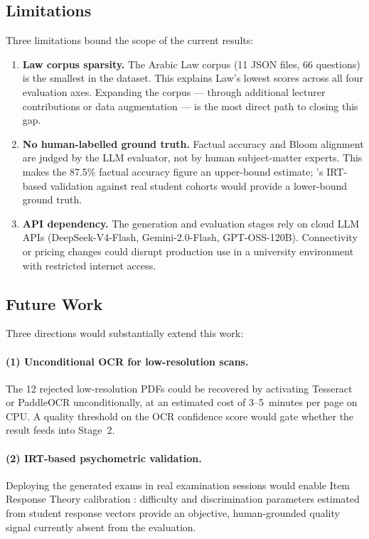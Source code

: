 \subsection*{Limitations}

Three limitations bound the scope of the current results:

\begin{enumerate}
  \item \textbf{Law corpus sparsity.}
  The Arabic Law corpus (11 JSON files, 66 questions) is the smallest in the dataset.
  This explains Law's lowest scores across all four evaluation axes.
  Expanding the corpus --- through additional lecturer contributions or data
  augmentation --- is the most direct path to closing this gap.

  \item \textbf{No human-labelled ground truth.}
  Factual accuracy and Bloom alignment are judged by the LLM evaluator, not by
  human subject-matter experts. This makes the 87.5\% factual accuracy figure an
  upper-bound estimate; \citet{isley2025quality}'s IRT-based validation against
  real student cohorts would provide a lower-bound ground truth.

  \item \textbf{API dependency.}
  The generation and evaluation stages rely on cloud LLM APIs
  (DeepSeek-V4-Flash, Gemini-2.0-Flash, GPT-OSS-120B).
  Connectivity or pricing changes could disrupt production use in a
  university environment with restricted internet access.
\end{enumerate}

\subsection*{Future Work}

Three directions would substantially extend this work:

\paragraph{(1) Unconditional OCR for low-resolution scans.}
The 12 rejected low-resolution PDFs could be recovered by activating Tesseract
or PaddleOCR unconditionally, at an estimated cost of 3--5~minutes per page on
CPU. A quality threshold on the OCR confidence score would gate whether the
result feeds into Stage~2.

\paragraph{(2) IRT-based psychometric validation.}
Deploying the generated exams in real examination sessions would enable
Item Response Theory calibration \cite{isley2025quality}: difficulty and
discrimination parameters estimated from student response vectors provide
an objective, human-grounded quality signal currently absent from the evaluation.

